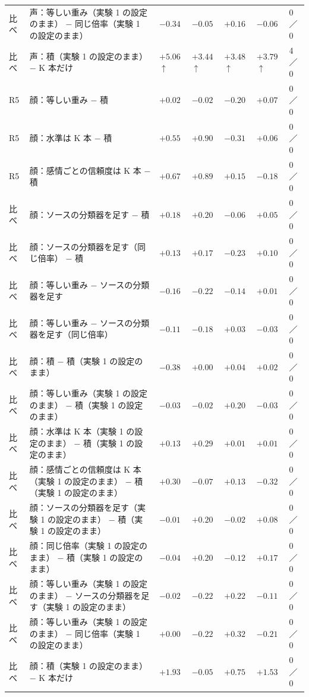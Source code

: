\begin{longtable}{>{\raggedright}p{0.75cm}>{\raggedright}p{5.6cm}>{\raggedright}p{2.05cm}>{\raggedright}p{2.05cm}>{\raggedright}p{2.05cm}>{\raggedright}p{2.05cm}p{0.75cm}}
比べ & 声：等しい重み（実験 1 の設定のまま） − 同じ倍率（実験 1 の設定のまま） & $-0.34$ & $-0.05$ & $+0.16$ & $-0.06$ & 0／0 \\
比べ & 声：積（実験 1 の設定のまま） − K 本だけ & $+5.06$$\uparrow$ & $+3.44$$\uparrow$ & $+3.48$$\uparrow$ & $+3.79$$\uparrow$ & 4／0 \\
\midrule
R5 & 顔：等しい重み − 積 & $+0.02$ & $-0.02$ & $-0.20$ & $+0.07$ & 0／0 \\
R5 & 顔：水準は K 本 − 積 & $+0.55$ & $+0.90$ & $-0.31$ & $+0.06$ & 0／0 \\
R5 & 顔：感情ごとの信頼度は K 本 − 積 & $+0.67$ & $+0.89$ & $+0.15$ & $-0.18$ & 0／0 \\
比べ & 顔：ソースの分類器を足す − 積 & $+0.18$ & $+0.20$ & $-0.06$ & $+0.05$ & 0／0 \\
比べ & 顔：ソースの分類器を足す（同じ倍率） − 積 & $+0.13$ & $+0.17$ & $-0.23$ & $+0.10$ & 0／0 \\
比べ & 顔：等しい重み − ソースの分類器を足す & $-0.16$ & $-0.22$ & $-0.14$ & $+0.01$ & 0／0 \\
比べ & 顔：等しい重み − ソースの分類器を足す（同じ倍率） & $-0.11$ & $-0.18$ & $+0.03$ & $-0.03$ & 0／0 \\
比べ & 顔：積 − 積（実験 1 の設定のまま） & $-0.38$ & $+0.00$ & $+0.04$ & $+0.02$ & 0／0 \\
比べ & 顔：等しい重み（実験 1 の設定のまま） − 積（実験 1 の設定のまま） & $-0.03$ & $-0.02$ & $+0.20$ & $-0.03$ & 0／0 \\
比べ & 顔：水準は K 本（実験 1 の設定のまま） − 積（実験 1 の設定のまま） & $+0.13$ & $+0.29$ & $+0.01$ & $+0.01$ & 0／0 \\
比べ & 顔：感情ごとの信頼度は K 本（実験 1 の設定のまま） − 積（実験 1 の設定のまま） & $+0.30$ & $-0.07$ & $+0.13$ & $-0.32$ & 0／0 \\
比べ & 顔：ソースの分類器を足す（実験 1 の設定のまま） − 積（実験 1 の設定のまま） & $-0.01$ & $+0.20$ & $-0.02$ & $+0.08$ & 0／0 \\
比べ & 顔：同じ倍率（実験 1 の設定のまま） − 積（実験 1 の設定のまま） & $-0.04$ & $+0.20$ & $-0.12$ & $+0.17$ & 0／0 \\
比べ & 顔：等しい重み（実験 1 の設定のまま） − ソースの分類器を足す（実験 1 の設定のまま） & $-0.02$ & $-0.22$ & $+0.22$ & $-0.11$ & 0／0 \\
比べ & 顔：等しい重み（実験 1 の設定のまま） − 同じ倍率（実験 1 の設定のまま） & $+0.00$ & $-0.22$ & $+0.32$ & $-0.21$ & 0／0 \\
比べ & 顔：積（実験 1 の設定のまま） − K 本だけ & $+1.93$ & $-0.05$ & $+0.75$ & $+1.53$ & 0／0 \\

\end{longtable}
